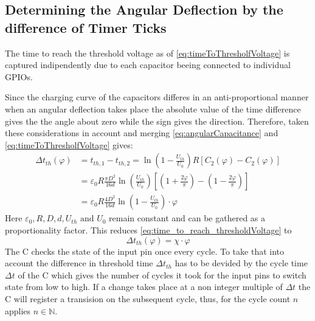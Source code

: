     \subsection*{Determining the Angular Deflection by the difference of Timer Ticks}
        The time to reach the threshold voltage as of \cref{eq:timeToThresholfVoltage} is captured indipendently due to
        each capacitor beeing connected to individual GPIOs.\par
        Since the charging curve of the capacitors differes in an anti-proportional manner when an angular deflection takes
        place the absolute value of the time difference gives the the angle about zero while the sign gives the direction.
        Therefore, taken these considerations in account and merging \cref{eq:angularCapacitance} and \cref{eq:timeToThresholfVoltage}
        gives:
        \begin{align}
            \Delta t_{th}(\varphi)   &= t_{th,1} - t_{th,2} = \ln\left( 1- \frac{U_{th}}{U_0} \right)R\left[ C_2(\varphi) - C_2(\varphi) \right] \nonumber \\
                            &= \varepsilon_0 R \frac{\pi D^2}{16d} \ln\left( \frac{U_{th}}{U_0} \right) \left[ \left( 1 + \frac{2\varphi}{\pi} \right) - \left( 1 - \frac{2\varphi}{\pi} \right) \right] \nonumber \\
                            &= \varepsilon_0 R \frac{4D^2}{16d} \ln\left( 1 - \frac{U_{th}}{U_0} \right) \cdot \varphi
            \label{eq:time_to_reach_thresholdVoltage}
        \end{align}
        Here \( \varepsilon_0, R, D, d, U_{th} \text{ and } U_0 \) remain constant and can be gathered as a proportionality
        factor. This reduces \cref{eq:time_to_reach_thresholdVoltage} to
        \begin{equation}
            \Delta t_{th}(\varphi) = \chi \cdot \varphi
            \label{eq:simplified_time_to_reach_thresholdVoltage}
        \end{equation}
        The \micro C checks the state of the input pin once every cycle. To take that into account the difference in threshold time
        \( \Delta t_{th} \) has to be devided by the cycle time \( \Delta t \) of the \micro C which gives the number of cycles it took for the
        input pins to switch state from low to high. If a change takes place at a non integer multiple of \( \Delta t \)
        the \micro C will register a transision on the subsequent cycle, thus, for the cycle count \( n \) applies \( n \in \mathbb{N} \).
